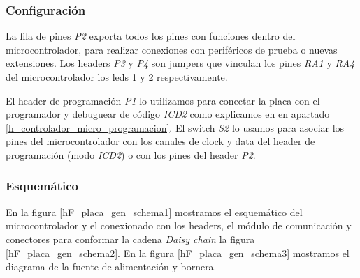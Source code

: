 \subsubsection{Configuraci\'on}
\label{h_placas_generica_config}

La fila de pines \emph{P2} exporta todos los pines con funciones dentro del microcontrolador, para realizar
conexiones con perif\'ericos de prueba o nuevas extensiones.
Los headers \emph{P3} y \emph{P4} son jumpers que vinculan los pines \emph{RA1} y \emph{RA4} del
microcontrolador los leds 1 y 2 respectivamente.

El header de programaci\'on \emph{P1} lo utilizamos para conectar la placa con el programador y debuguear
de c\'odigo \emph{ICD2} como explicamos en en apartado \ref{h_controlador_micro_programacion}.
El switch \emph{S2} lo usamos para asociar los pines del microcontrolador con los canales de clock
y data del header de programaci\'on (modo \emph{ICD2}) o con los pines del header \emph{P2}.

\subsubsection{Esquem\'atico}
\label{h_placas_generica_esquematicos}

En la figura \ref{hF_placa_gen_schema1} mostramos el esquem\'atico del microcontrolador y el conexionado
con los headers, el m\'odulo de comunicaci\'on y conectores para conformar la cadena \emph{Daisy chain}
la figura \ref{hF_placa_gen_schema2}.
En la figura \ref{hF_placa_gen_schema3} mostramos el diagrama de la fuente de alimentaci\'on y bornera.

